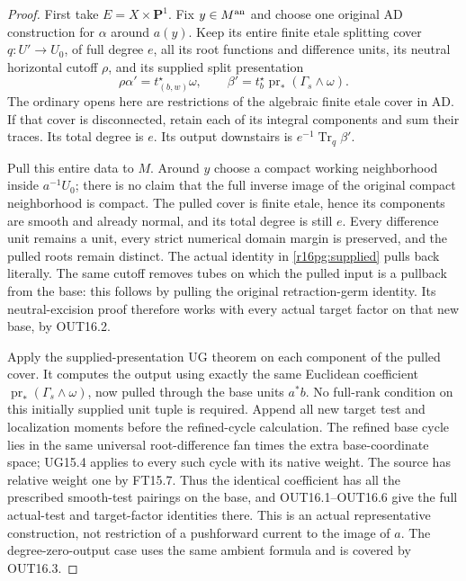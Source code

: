 \documentclass[11pt,a4paper]{article}
\theoremstyle{definition}
\theoremstyle{remark}
\numberwithin{equation}{section}
\begin{document}
\begin{proof}
First take $E=X\times\mathbf P^1$. Fix $y\in M^{\rm an}$ and
choose one original AD construction for $\alpha$ around $a(y)$.
Keep its entire finite etale splitting cover
$q:U'\to U_0$, of full degree $e$, all its root functions and
difference units, its neutral horizontal cutoff $\rho$, and its
supplied split presentation
\[
 \rho\alpha'=t_{(b,w)}^\star\omega,
 \qquad
 \beta'=t_b^\star\operatorname{pr}_*(\Gamma_s\wedge\omega).
 \tag{PG16.2}\label{r16pg:supplied}
\]
The ordinary opens here are restrictions of the algebraic finite
etale cover in AD. If that cover is disconnected, retain each of
its integral components and sum their traces. Its total degree
is $e$. Its output downstairs is $e^{-1}\operatorname{Tr}_q\beta'$.

Pull this entire data to $M$. Around $y$ choose a compact working
neighborhood inside $a^{-1}U_0$; there is no claim that the full
inverse image of the original compact neighborhood is compact.
The pulled cover is finite etale, hence its components are smooth
and already normal, and its total degree is still $e$.
Every difference unit remains a unit, every strict numerical
domain margin is preserved, and the pulled roots remain distinct.
The actual identity in \eqref{r16pg:supplied} pulls back literally.
The same cutoff removes tubes on which the pulled input is a
pullback from the base: this follows by pulling the original
retraction-germ identity. Its neutral-excision proof therefore
works with every actual target factor on that new base, by OUT16.2.

Apply the supplied-presentation UG theorem on each component of
the pulled cover. It computes the output using exactly the same
Euclidean coefficient $\operatorname{pr}_*(\Gamma_s\wedge\omega)$,
now pulled through the base units $a^*b$. No full-rank condition
on this initially supplied unit tuple is required. Append all
new target test and localization moments before the refined-cycle
calculation. The refined base cycle lies in the same universal
root-difference fan times the extra base-coordinate space; UG15.4
applies to every such cycle with its native weight. The source
has relative weight one by FT15.7. Thus the identical coefficient
has all the prescribed smooth-test pairings on the base, and
OUT16.1--OUT16.6 give the full actual-test and target-factor
identities there. This is an actual representative construction,
not restriction of a pushforward current to the image of $a$.
The degree-zero-output case uses the same ambient formula and
is covered by OUT16.3.


\end{proof}
\end{document}
